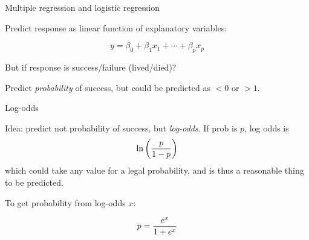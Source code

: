 \documentclass[pdf]{prosper}
\begin{document}
\begin{slide}{Multiple regression and logistic regression}

Predict response as linear function of explanatory variables:

$$ y = \beta_0 +\beta_1 x_1 + \cdots + \beta_p x_p$$

But if response is success/failure (lived/died)?

Predict {\em probability} of success, but could be predicted as $<0$
or $>1$.
  
\end{slide}

\begin{slide}{Log-odds}

Idea: predict not probability of success, but {\em log-odds}. If prob
is $p$, log odds is
$$ \ln \left( {p \over 1-p } \right) $$
which could take any value for a legal probability, and is thus a
reasonable thing to be predicted.

To get probability from log-odds $x$:

$$ p = { e^x \over 1 + e^x }$$
  
\end{slide}
\end{document}
